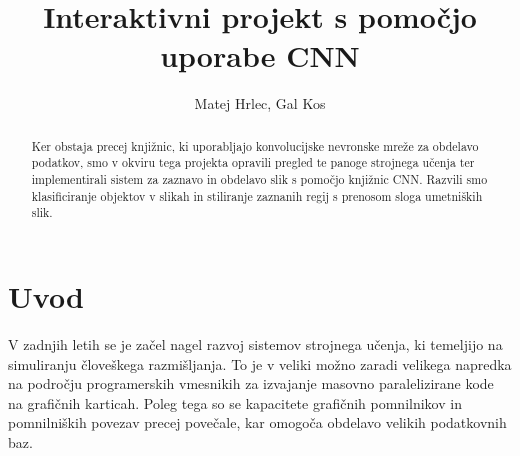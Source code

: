 \documentclass[runningheads,a4paper]{llncs}
\newcommand{\keywords}[1]{\par\addvspace\baselineskip
\noindent\keywordname\enspace\ignorespaces#1}
\begin{document}
\mainmatter  %

\title{Interaktivni projekt s pomočjo uporabe CNN}


%
%
\author{Matej Hrlec, Gal Kos}
%


%
%

\maketitle


\begin{abstract}
Ker obstaja precej knjižnic, ki uporabljajo konvolucijske nevronske mreže za obdelavo podatkov, smo v okviru tega projekta opravili pregled te panoge strojnega učenja ter implementirali sistem za zaznavo in obdelavo slik s pomočjo knjižnic CNN. Razvili smo klasificiranje objektov v slikah in stiliranje zaznanih regij s prenosom sloga umetniških slik.
\end{abstract}


\section{Uvod}
V zadnjih letih se je začel nagel razvoj sistemov strojnega učenja, ki temeljijo na simuliranju človeškega razmišljanja. To je v veliki možno zaradi velikega napredka na področju programerskih vmesnikih za izvajanje masovno paralelizirane kode na grafičnih karticah. Poleg tega so se kapacitete grafičnih pomnilnikov in pomnilniških povezav precej povečale, kar omogoča obdelavo velikih podatkovnih baz.
\end{document}
